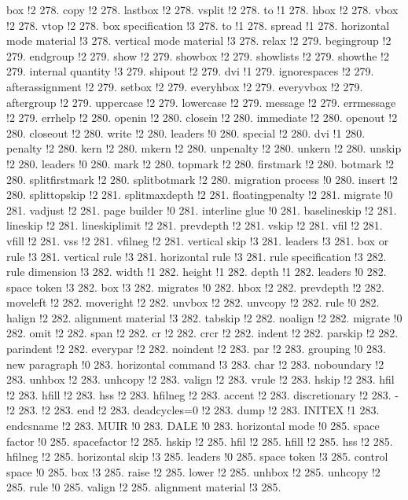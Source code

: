 box !2 278.
copy !2 278.
lastbox !2 278.
vsplit !2 278.
to !1 278.
hbox !2 278.
vbox !2 278.
vtop !2 278.
box specification !3 278.
to !1 278.
spread !1 278.
horizontal mode material !3 278.
vertical mode material !3 278.
relax !2 279.
begingroup !2 279.
endgroup !2 279.
show !2 279.
showbox !2 279.
showlists !2 279.
showthe !2 279.
internal quantity !3 279.
shipout !2 279.
dvi !1 279.
ignorespaces !2 279.
afterassignment !2 279.
setbox !2 279.
everyhbox !2 279.
everyvbox !2 279.
aftergroup !2 279.
uppercase !2 279.
lowercase !2 279.
message !2 279.
errmessage !2 279.
errhelp !2 280.
openin !2 280.
closein !2 280.
immediate !2 280.
openout !2 280.
closeout !2 280.
write !2 280.
leaders !0 280.
special !2 280.
dvi !1 280.
penalty !2 280.
kern !2 280.
mkern !2 280.
unpenalty !2 280.
unkern !2 280.
unskip !2 280.
leaders !0 280.
mark !2 280.
topmark !2 280.
firstmark !2 280.
botmark !2 280.
splitfirstmark !2 280.
splitbotmark !2 280.
migration process !0 280.
insert !2 280.
splittopskip !2 281.
splitmaxdepth !2 281.
floatingpenalty !2 281.
migrate !0 281.
vadjust !2 281.
page builder !0 281.
interline glue !0 281.
baselineskip !2 281.
lineskip !2 281.
lineskiplimit !2 281.
prevdepth !2 281.
vskip !2 281.
vfil !2 281.
vfill !2 281.
vss !2 281.
vfilneg !2 281.
vertical skip !3 281.
leaders !3 281.
box or rule !3 281.
vertical rule !3 281.
horizontal rule !3 281.
rule specification !3 282.
rule dimension !3 282.
width !1 282.
height !1 282.
depth !1 282.
leaders !0 282.
space token !3 282.
box !3 282.
migrates !0 282.
hbox !2 282.
prevdepth !2 282.
moveleft !2 282.
moveright !2 282.
unvbox !2 282.
unvcopy !2 282.
rule !0 282.
halign !2 282.
alignment material !3 282.
tabskip !2 282.
noalign !2 282.
migrate !0 282.
omit !2 282.
span !2 282.
cr !2 282.
crcr !2 282.
indent !2 282.
parskip !2 282.
parindent !2 282.
everypar !2 282.
noindent !2 283.
par !2 283.
grouping !0 283.
new paragraph !0 283.
horizontal command !3 283.
char !2 283.
noboundary !2 283.
unhbox !2 283.
unhcopy !2 283.
valign !2 283.
vrule !2 283.
hskip !2 283.
hfil !2 283.
hfill !2 283.
hss !2 283.
hfilneg !2 283.
accent !2 283.
discretionary !2 283.
- !2 283.
 !2 283.
end !2 283.
deadcycles=0 !2 283.
dump !2 283.
INITEX !1 283.
endcsname !2 283.
MUIR !0 283.
DALE !0 283.
horizontal mode !0 285.
space factor !0 285.
spacefactor !2 285.
hskip !2 285.
hfil !2 285.
hfill !2 285.
hss !2 285.
hfilneg !2 285.
horizontal skip !3 285.
leaders !0 285.
space token !3 285.
control space !0 285.
box !3 285.
raise !2 285.
lower !2 285.
unhbox !2 285.
unhcopy !2 285.
rule !0 285.
valign !2 285.
alignment material !3 285.
